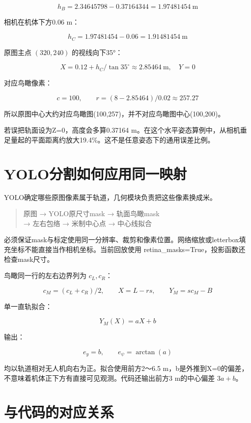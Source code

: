 \documentclass[UTF8,a4paper,11pt,fontset=windows]{ctexart}
\begin{document}
\[
h_B=2.34645798-0.37164344=1.97481454\ \mathrm m
\]

相机在机体下方0.06 m：


\[
h_C=1.97481454-0.06=1.91481454\ \mathrm m
\]

原图主点 \((320,240)\) 的视线向下35°：


\[
X=0.12+h_C/\tan35^\circ\approx2.85464\ \mathrm m,\quad Y=0
\]

对应鸟瞰像素：


\[
c=100,\qquad r=(8-2.85464)/0.02\approx257.27
\]

所以原图中心大约对应鸟瞰图(100,257)，并不对应鸟瞰图中心(100,200)。


若误把轨面设为Z=0，高度会多算0.37164 m。在这个水平姿态算例中，从相机垂足量起的平面距离约放大19.4\%。这不是任意姿态下的通用误差比例。


\section{YOLO分割如何应用同一映射}

YOLO确定哪些原图像素属于轨道，几何模块负责把这些像素换成米。


\begin{quote}\small 原图 → YOLO原尺寸mask → 轨面鸟瞰mask\\ → 左右包络 → 米制中心点 → 中心线拟合\end{quote}

必须保证mask与标定使用同一分辨率、裁剪和像素位置。网络缩放或letterbox填充坐标不能直接当作相机坐标。当前回放使用 retina\_masks=True，投影函数还检查mask尺寸。


鸟瞰同一行的左右边界列为 \(c_L,c_R\)：


\[
c_M=(c_L+c_R)/2,\qquad X=L-rs,\qquad Y_M=sc_M-B
\]

单一直轨拟合：


\[
Y_M(X)=aX+b
\]

输出：


\[
e_y=b,\qquad e_\psi=\arctan(a)
\]

均以轨道相对无人机向右为正。拟合使用前方2～6.5 m，b是外推到X=0的偏差，不意味着机体正下方有直接可见观测。代码还输出前方3 m的中心偏差 \(3a+b\)。


\section{与代码的对应关系}
\end{document}
